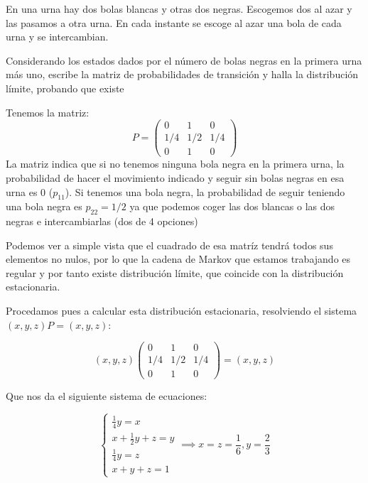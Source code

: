 \begin{problem}[9]
	En una urna hay dos bolas blancas y otras dos negras. Escogemos dos al azar y las pasamos a otra urna. En cada instante se escoge al azar una bola de cada urna y se intercambian.

	Considerando los estados dados por el número de bolas negras en la primera urna más uno, escribe la matriz de probabilidades de transición y halla la distribución límite, probando que existe

	\solution

	Tenemos la matriz:
	\[P= \begin{pmatrix}
	0&1&0\\
	1/4&1/2&1/4\\
	0&1&0
	\end{pmatrix}\]
	La matriz indica que si no tenemos ninguna bola negra en la primera urna, la probabilidad de hacer el movimiento indicado y seguir sin bolas negras en esa urna es 0 ($p_{11}$). Si tenemos una bola negra, la probabilidad de seguir teniendo una bola negra es $p_{22}=1/2$ ya que podemos coger las dos blancas o las dos negras e intercambiarlas (dos de 4 opciones)

	Podemos ver a simple vista que el cuadrado de esa matríz tendrá todos sus elementos no nulos, por lo que la cadena de Markov que estamos trabajando es regular y por tanto existe distribución límite, que coincide con la distribución estacionaria.

	Procedamos pues a calcular esta distribución estacionaria, resolviendo el sistema $(x,y,z) P = (x,y,z)$:

	\[
	(x,y,z) \begin{pmatrix}
	0&1&0\\
	1/4&1/2&1/4\\
	0&1&0
	\end{pmatrix} = (x,y,z)
	\]

	Que nos da el siguiente sistema de ecuaciones:

	\[\begin{cases}
		 \frac{1}{4}y=x\\
		 x+\frac{1}{2}y+z=y\\
		 \frac{1}{4}y=z\\
		 x+y+z=1
	\end{cases} \implies x=z=\frac{1}{6}, y = \frac{2}{3}\]
\end{problem}

